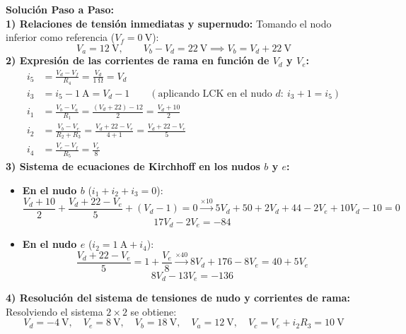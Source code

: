 \begin{ejercicio}
\textbf{Solución Paso a Paso:}\\[4pt]
\textbf{1) Relaciones de tensión inmediatas y supernudo:}
Tomando el nodo inferior como referencia ($V_f = 0\ \si{\volt}$):
\begin{equation}
    V_a = 12\ \si{\volt}, \qquad V_b - V_d = 22\ \si{\volt} \implies V_b = V_d + 22\ \si{\volt}
\end{equation}
\textbf{2) Expresión de las corrientes de rama en función de $V_d$ y $V_e$:}
\begin{align}
    i_5 &= \frac{V_d - V_f}{R_4} = \frac{V_d}{1\ \si{\ohm}} = V_d \\
    i_3 &= i_5 - 1\ \si{\ampere} = V_d - 1 \qquad (\text{aplicando LCK en el nudo } d:\ i_3 + 1 = i_5) \\
    i_1 &= \frac{V_b - V_a}{R_1} = \frac{(V_d + 22) - 12}{2} = \frac{V_d + 10}{2} \\
    i_2 &= \frac{V_b - V_e}{R_2 + R_3} = \frac{V_d + 22 - V_e}{4 + 1} = \frac{V_d + 22 - V_e}{5} \\
    i_4 &= \frac{V_e - V_f}{R_5} = \frac{V_e}{8}
\end{align}
\textbf{3) Sistema de ecuaciones de Kirchhoff en los nudos $b$ y $e$:}
\begin{itemize}[leftmargin=*]
    \item \textbf{En el nudo $b$} ($i_1 + i_2 + i_3 = 0$):
    \begin{equation}
        \frac{V_d + 10}{2} + \frac{V_d + 22 - V_e}{5} + (V_d - 1) = 0 \xrightarrow{\times 10} 5V_d + 50 + 2V_d + 44 - 2V_e + 10V_d - 10 = 0
    \end{equation}
    \begin{equation}
        17 V_d - 2 V_e = -84
    \end{equation}
    \item \textbf{En el nudo $e$} ($i_2 = 1\ \si{\ampere} + i_4$):
    \begin{equation}
        \frac{V_d + 22 - V_e}{5} = 1 + \frac{V_e}{8} \xrightarrow{\times 40} 8V_d + 176 - 8V_e = 40 + 5V_e
    \end{equation}
    \begin{equation}
        8 V_d - 13 V_e = -136
    \end{equation}
\end{itemize}
\textbf{4) Resolución del sistema de tensiones de nudo y corrientes de rama:}
Resolviendo el sistema $2 \times 2$ se obtiene:
\begin{equation}
    \boxed{V_d = -4\ \si{\volt}, \quad V_e = 8\ \si{\volt}, \quad V_b = 18\ \si{\volt}, \quad V_a = 12\ \si{\volt}, \quad V_c = V_e + i_2 R_3 = 10\ \si{\volt}}

\end{equation}
\end{ejercicio}
